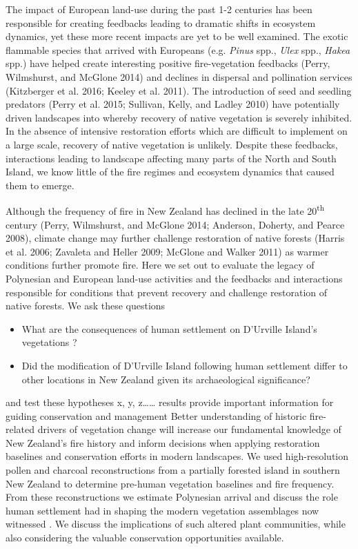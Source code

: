 \documentclass[]{article}
\begin{document}
The impact of European land-use during the past 1-2 centuries has been responsible for creating feedbacks leading to dramatic shifts in ecosystem dynamics, yet these more recent impacts are yet to be well examined. The exotic flammable species that arrived with Europeans (e.g. \emph{Pinus} spp., \emph{Ulex} spp., \emph{Hakea} spp.) have helped create interesting positive fire-vegetation feedbacks (Perry, Wilmshurst, and McGlone 2014) and declines in dispersal and pollination services (Kitzberger et al. 2016; Keeley et al. 2011). The introduction of seed and seedling predators (Perry et al. 2015; Sullivan, Kelly, and Ladley 2010) have potentially driven landscapes into whereby recovery of native vegetation is severely inhibited. In the absence of intensive restoration efforts which are difficult to implement on a large scale, recovery of native vegetation is unlikely. Despite these feedbacks, interactions leading to landscape affecting many parts of the North and South Island, we know little of the fire regimes and ecosystem dynamics that caused them to emerge.

Although the frequency of fire in New Zealand has declined in the late 20\textsuperscript{th} century (Perry, Wilmshurst, and McGlone 2014; Anderson, Doherty, and Pearce 2008), climate change may further challenge restoration of native forests (Harris et al. 2006; Zavaleta and Heller 2009; McGlone and Walker 2011) as warmer conditions further promote fire. Here we set out to evaluate the legacy of Polynesian and European land-use activities and the feedbacks and interactions responsible for conditions that prevent recovery and challenge restoration of native forests. We ask these questions

\begin{itemize}
\item
  What are the consequences of human settlement on D'Urville Island's vegetations ?
\item
  Did the modification of D'Urville Island following human settlement differ to other locations in New Zealand given its archaeological significance?
\end{itemize}

and test these hypotheses x, y, z\ldots{}\ldots{} results provide important information for guiding conservation and management Better understanding of historic fire-related drivers of vegetation change will increase our fundamental knowledge of New Zealand's fire history and inform decisions when applying restoration baselines and conservation efforts in modern landscapes. We used high-resolution pollen and charcoal reconstructions from a partially forested island in southern New Zealand to determine pre-human vegetation baselines and fire frequency. From these reconstructions we estimate Polynesian arrival and discuss the role human settlement had in shaping the modern vegetation assemblages now witnessed . We discuss the implications of such altered plant communities, while also considering the valuable conservation opportunities available.
\end{document}
